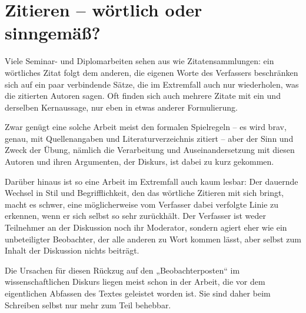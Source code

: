 \documentclass[]{book}
\theoremstyle{definition}
\theoremstyle{definition}
\theoremstyle{definition}
\theoremstyle{remark}
\begin{document}
\section{Zitieren -- wörtlich oder
sinngemäß?}\label{zitieren-wortlich-oder-sinngema}

Viele Seminar- und Diplomarbeiten sehen aus wie Zitatensammlungen: ein
wörtliches Zitat folgt dem anderen, die eigenen Worte des Verfassers
beschränken sich auf ein paar verbindende Sätze, die im Extremfall auch
nur wiederholen, was die zitierten Autoren sagen. Oft finden sich auch
mehrere Zitate mit ein und derselben Kernaussage, nur eben in etwas
anderer Formulierung.

Zwar genügt eine solche Arbeit meist den formalen Spielregeln -- es wird
brav, genau, mit Quellenangaben und Literaturverzeichnis zitiert -- aber
der Sinn und Zweck der Übung, nämlich die Verarbeitung und
Auseinandersetzung mit diesen Autoren und ihren Argumenten, der Diskurs,
ist dabei zu kurz gekommen.

Darüber hinaus ist so eine Arbeit im Extremfall auch kaum lesbar: Der
dauernde Wechsel in Stil und Begrifflichkeit, den das wörtliche Zitieren
mit sich bringt, macht es schwer, eine möglicherweise vom Verfasser
dabei verfolgte Linie zu erkennen, wenn er sich selbst so sehr
zurückhält. Der Verfasser ist weder Teilnehmer an der Diskussion noch
ihr Moderator, sondern agiert eher wie ein unbeteiligter Beobachter, der
alle anderen zu Wort kommen lässt, aber selbst zum Inhalt der Diskussion
nichts beiträgt.

Die Ursachen für diesen Rückzug auf den „Beobachterposten`` im
wissenschaftlichen Diskurs liegen meist schon in der Arbeit, die vor dem
eigentlichen Abfassen des Textes geleistet worden ist. Sie sind daher
beim Schreiben selbst nur mehr zum Teil behebbar.
\end{document}
